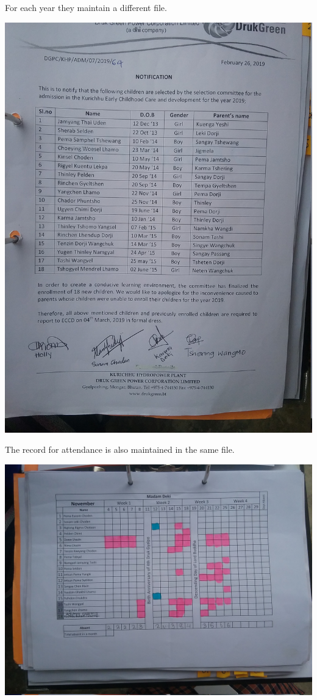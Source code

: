 \documentclass{scrreprt}
\begin{document}
\begin{itemize}
		 For each year they maintain a different file.
		
		\includegraphics[scale=.2]{5}
		
		The record for attendance is also maintained in the same file.
		
		\includegraphics[scale=.2]{9}
		

\end{itemize}
\end{document}
